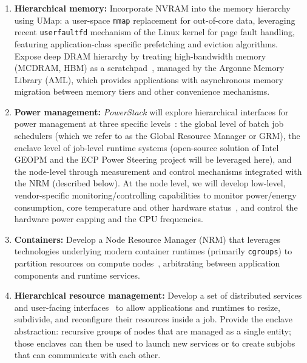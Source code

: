 \begin{enumerate}

\item \textbf{Hierarchical memory:} Incorporate NVRAM into the memory hierarchy
using UMap: a user-space \texttt{mmap} replacement for out-of-core data,
leveraging recent \texttt{userfaultfd} mechanism of the Linux kernel for page fault
handling, featuring application-class specific prefetching and eviction
algorithms.  Expose deep DRAM hierarchy by treating high-bandwidth memory
(MCDRAM, HBM) as a scratchpad~\cite{perarnau2016exploring}, managed by the Argonne Memory Library (AML),
which provides applications with asynchronous memory migration
between memory tiers and other convenience mechanisms.

\item \textbf{Power management:}
\emph{PowerStack} will explore hierarchical interfaces for power management
at three specific
levels~\cite{Ellsworth:argo,ellsworth_e2sc2016,patki2016,sakamoto2017}: the
global level of batch job schedulers (which we refer to as the Global
Resource Manager or GRM), the enclave level of job-level runtime systems
(open-source solution of Intel GEOPM and the ECP Power Steering project
will be leveraged here), and the node-level through measurement and control
mechanisms integrated with the NRM (described below).
At the node level, we will develop low-level, vendor-specific 
monitoring/controlling capabilities to monitor power/energy consumption,
core temperature and other hardware status~\cite{osti_1353371,zhang2015minimizing}, and control the hardware power
capping and the CPU frequencies. 

\item \textbf{Containers:} Develop a Node Resource Manager (NRM) that leverages
technologies underlying modern container runtimes
(primarily \texttt{cgroups}) to partition resources on compute nodes~\cite{zounmevo2015container},
arbitrating between application components and runtime services.

\item \textbf{Hierarchical resource management:} Develop a set of distributed
services and user-facing interfaces~\cite{perarnau2015distributed} to allow applications and runtimes to
resize, subdivide, and reconfigure their resources inside a job.  Provide
the enclave abstraction: recursive groups of nodes that are managed as a
single entity; those enclaves can then be used to launch new services or to
create subjobs that can communicate with each other.
\end{enumerate}


